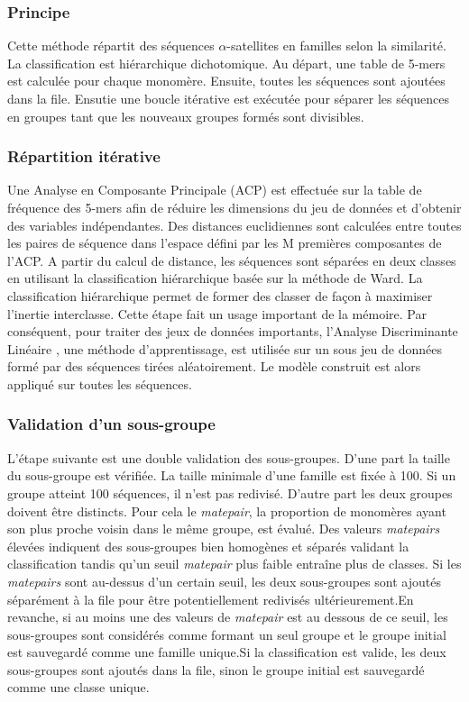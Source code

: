 \documentclass[12pt,a4paper]{article}
\begin{document}
	\subsubsection{Principe}
Cette méthode \cite{rapport_florence} répartit des séquences $\alpha$-satellites en familles selon la similarité. La classification est hiérarchique dichotomique. Au départ, une table de 5-mers est calculée pour chaque monomère.  Ensuite, toutes les séquences sont ajoutées dans la file. Ensutie une boucle itérative est exécutée pour séparer les séquences en groupes tant que les nouveaux groupes formés sont divisibles.
	\subsubsection{Répartition itérative}
Une Analyse en Composante Principale (ACP) est effectuée sur la table de fréquence des 5-mers afin de réduire les dimensions du jeu de données et d’obtenir des variables indépendantes. Des distances euclidiennes sont calculées entre toutes les paires de séquence dans l’espace défini par les M premières composantes de l’ACP. A partir du calcul de distance, les séquences sont séparées en deux classes en utilisant la classification hiérarchique basée sur la méthode de Ward. La classification hiérarchique permet de former des classer de façon à maximiser l’inertie interclasse. Cette étape fait un usage important de la mémoire. Par conséquent, pour traiter des jeux de données importants, l’Analyse Discriminante Linéaire , une méthode d’apprentissage, est utilisée sur un sous jeu de données formé par des séquences tirées aléatoirement. Le modèle construit est alors appliqué sur toutes les séquences.
	\subsubsection{Validation d'un sous-groupe}
L'étape suivante est une double validation des sous-groupes. D'une part la taille du sous-groupe est vérifiée. La taille minimale d'une famille est fixée à 100. Si un groupe atteint 100 séquences, il n'est pas redivisé. D'autre part les deux groupes doivent être distincts. Pour cela le \textit{matepair}, la proportion de monomères ayant son plus proche voisin dans le même groupe, est évalué. Des valeurs \textit{matepairs} élevées indiquent des sous-groupes bien homogènes et séparés validant la classification tandis qu’un seuil \textit{matepair} plus faible entraîne plus de classes. Si les \textit{matepairs} sont au-dessus d’un certain seuil, les deux sous-groupes sont ajoutés séparément à la file pour être potentiellement redivisés ultérieurement.En revanche, si au moins une des valeurs de \textit{matepair} est au dessous de ce seuil, les sous-groupes sont considérés comme formant un seul groupe et le groupe initial est sauvegardé comme une famille unique.Si la classification est valide, les deux sous-groupes sont ajoutés dans la file, sinon le groupe initial est sauvegardé comme une classe unique. 
\end{document}
